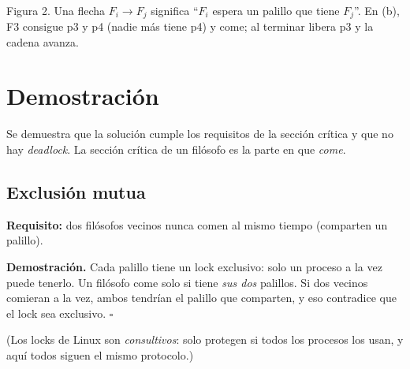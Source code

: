 \documentclass[12pt,letterpaper]{article}
\begin{document}
\begin{center}
\\[3pt]
{\footnotesize Figura 2. Una flecha $F_i\to F_j$ significa ``$F_i$ espera un palillo que tiene $F_j$''. En (b), F3 consigue p3 y p4 (nadie más tiene p4) y come; al terminar libera p3 y la cadena avanza.}
\end{center}

\section{Demostración}
Se demuestra que la solución cumple los requisitos de la sección crítica y que no hay \emph{deadlock}. La sección crítica de un filósofo es la parte en que \emph{come}.

\subsection{Exclusión mutua}
\textbf{Requisito:} dos filósofos vecinos nunca comen al mismo tiempo (comparten un palillo).

\textbf{Demostración.} Cada palillo tiene un lock exclusivo: solo un proceso a la vez puede tenerlo. Un filósofo come solo si tiene \emph{sus dos} palillos. Si dos vecinos comieran a la vez, ambos tendrían el palillo que comparten, y eso contradice que el lock sea exclusivo. \hfill$\square$

(Los locks de Linux son \emph{consultivos}: solo protegen si todos los procesos los usan, y aquí todos siguen el mismo protocolo.)
\end{document}
